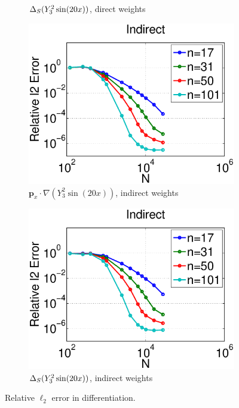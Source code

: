 \begin{figure}
\begin{subfigure}[t]{0.48\textwidth}
	\caption{$\Delta_S ( Y_{3}^{2} \sin(20 x) )$, direct weights}
			\label{fig:direct_vs_indirect_relative_error_lsfc_direct}
    \end{subfigure}
    	\begin{subfigure}[t]{0.48\textwidth}
	\includegraphics[width=1.0\textwidth]{../figures/appendices/direct_vs_indirect_weights/compare_weight_generation/xsfc_vs_xsfc_alt_on_sph32_times_sine_20x/indirect_rel_l2_error.eps}
	\caption{$\mathbf{p}_{x} \cdot \nabla ( Y_{3}^{2} \sin(20 x))$, indirect weights}
		\label{fig:direct_vs_indirect_relative_error_xsfc_indirect}
	\end{subfigure}
	\begin{subfigure}[t]{0.48\textwidth}
	\includegraphics[width=1.0\textwidth]{../figures/appendices/direct_vs_indirect_weights/compare_weight_generation/lsfc_vs_px_grad_dot_px_grad/indirect_rel_l2_error.eps}
	\caption{$\Delta_S ( Y_{3}^{2} \sin(20 x) )$, indirect weights}
		\label{fig:direct_vs_indirect_relative_error_lsfc_indirect}
    \end{subfigure}
	\caption{Relative $\ell_{2}$ error in differentiation.}
	\label{fig:direct_vs_indirect_relative_error}
\end{figure}

